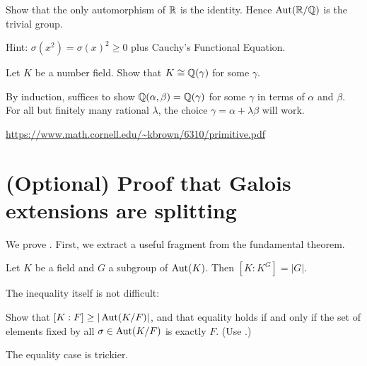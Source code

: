 \begin{problem}
	Show that the only automorphism of $\mathbb R$ is the identity.
	Hence $\operatorname{Aut}(\mathbb R/\mathbb Q)$ is the trivial group.
	\begin{hint}
		Hint: $\sigma(x^2) = \sigma(x)^2 \ge 0$ plus Cauchy's Functional Equation.
	\end{hint}
\end{problem}

\begin{problem}
	\twochili
	Let $K$ be a number field.
	Show that $K \cong \mathbb Q(\gamma)$ for some $\gamma$.
	\label{prob:artin_primitive_elm}
	\begin{hint}
		By induction, suffices to show $\mathbb Q(\alpha, \beta) = \mathbb Q(\gamma)$
		for some $\gamma$ in terms of $\alpha$ and $\beta$.
		For all but finitely many rational $\lambda$,
		the choice $\gamma = \alpha + \lambda \beta$ will work.
	\end{hint}
	\begin{sol}
		\url{https://www.math.cornell.edu/~kbrown/6310/primitive.pdf}
	\end{sol}
\end{problem}

\section{(Optional) Proof that Galois extensions are splitting}
We prove .
First, we extract a useful fragment from the fundamental theorem.
\begin{theorem}
	\label{thm:fixed_field_theorem}
	Let $K$ be a field and $G$ a subgroup of $\operatorname{Aut}(K)$.
	Then $[K:K^G] = \left\lvert G \right\rvert$.
\end{theorem}

The inequality itself is not difficult:
\begin{exercise}
	Show that $[K:F] \ge |\operatorname{Aut}(K/F)|$,
	and that equality holds if and only if
	the set of elements fixed by all $\sigma \in \operatorname{Aut}(K/F)$
	is exactly $F$.
	(Use .)
\end{exercise}
The equality case is trickier.

